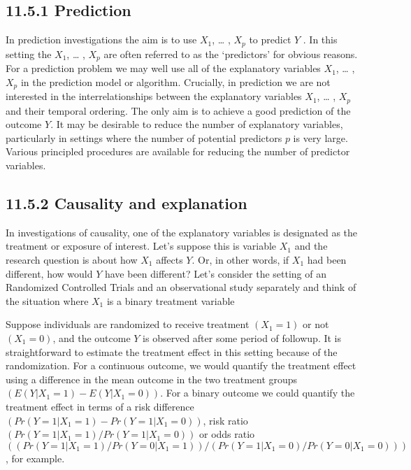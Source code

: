 \documentclass[letterpaper,10pt,english]{jupyterBook}
\begin{document}
\subsection{11.5.1 Prediction}
\label{\detokenize{11.f. Types of Investigation:prediction}}
\sphinxAtStartPar
In prediction investigations the aim is to use \(X_{1}\), … , \(X_{p}\) to predict \(Y\) . In this setting the \(X_{1}\), … , \(X_{p}\) are often referred to as the ‘predictors’ for obvious reasons. For a prediction problem we may well use all of the explanatory variables \(X_{1}\), … , \(X_{p}\) in the prediction model or algorithm. Crucially, in prediction we are not interested in the inter\sphinxhyphen{}relationships between the explanatory variables \(X_{1}\), … , \(X_{p}\) and their temporal ordering. The only aim is to achieve a good prediction of the outcome \(Y\). It may be desirable to reduce the number of explanatory variables, particularly in settings where the number of potential predictors \(p\) is very large. Various principled procedures are available for reducing the number of predictor variables.


\subsection{11.5.2 Causality and explanation}
\label{\detokenize{11.f. Types of Investigation:causality-and-explanation}}
\sphinxAtStartPar
In investigations of causality, one of the explanatory variables is designated as the treatment or exposure of interest. Let’s suppose this is variable \(X_{1}\) and the research question is about how \(X_{1}\) affects \(Y\). Or, in other words, if \(X_{1}\) had been different, how would \(Y\) have been different? Let’s consider the setting of an Randomized Controlled Trials and an observational study separately and think of the situation where \(X_{1}\) is a binary treatment variable

\sphinxAtStartPar
{}

\sphinxAtStartPar
Suppose individuals are randomized to receive treatment \((X_{1} = 1)\) or not \((X_{1} = 0)\), and the outcome \(Y\) is observed after some period of follow\sphinxhyphen{}up. It is straightforward to estimate the treatment effect in this setting because of the randomization. For a continuous outcome, we would quantify the treatment effect using a difference in the mean outcome in the two treatment groups \((E(Y |X_{1} = 1) − E(Y |X_{1} = 0))\). For a binary outcome we could quantify the treatment effect in terms of a risk difference \((Pr(Y = 1|X_{1} = 1) − Pr(Y = 1|X_{1} = 0))\), risk ratio \((Pr(Y = 1|X_{1} = 1)/Pr(Y = 1|X_{1} = 0))\) or odds ratio \(((Pr(Y = 1|X_{1} = 1)/Pr(Y = 0|X_{1} = 1))/(Pr(Y = 1|X_{1} = 0)/Pr(Y = 0|X_{1} = 0)))\), for example.
\end{document}
